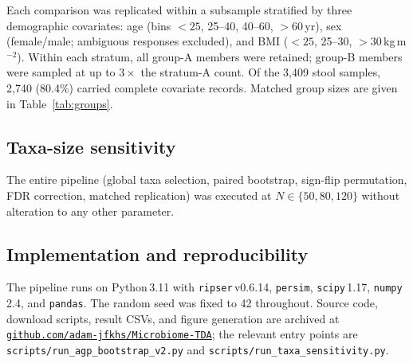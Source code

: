 Each comparison was replicated within a subsample stratified by three
demographic covariates: age (bins $<25$, 25--40, 40--60, $>60$\,yr), sex
(female/male; ambiguous responses excluded), and BMI ($<25$, 25--30,
$>30$\,kg\,m$^{-2}$).
Within each stratum, all group-A members were retained; group-B members
were sampled at up to $3 \times$ the stratum-A count.
Of the 3,409 stool samples, 2,740 (80.4\%) carried complete covariate records.
Matched group sizes are given in Table~\ref{tab:groups}.

\subsection{Taxa-size sensitivity}
\label{subsec:design_sensitivity}

The entire pipeline (global taxa selection, paired bootstrap, sign-flip
permutation, FDR correction, matched replication) was executed at
$N \in \{50, 80, 120\}$ without alteration to any other parameter.

\subsection{Implementation and reproducibility}
\label{subsec:repro}

The pipeline runs on Python\,3.11 with \texttt{ripser}\,v0.6.14,
\texttt{persim}, \texttt{scipy}\,1.17, \texttt{numpy}\,2.4, and
\texttt{pandas}.
The random seed was fixed to 42 throughout.
Source code, download scripts, result CSVs, and figure generation are
archived at
\href{https://github.com/adam-jfkhs/Microbiome-TDA}%
{\texttt{github.com/adam-jfkhs/Microbiome-TDA}};
the relevant entry points are \texttt{scripts/run\_agp\_bootstrap\_v2.py}
and \texttt{scripts/run\_taxa\_sensitivity.py}.
